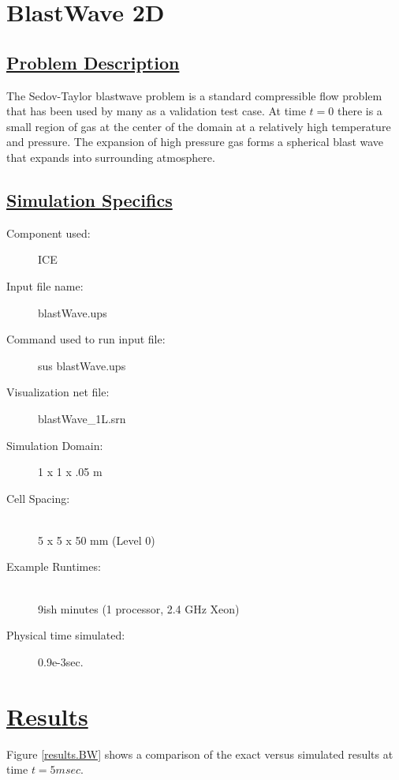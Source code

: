 
\section*{\center BlastWave 2D}
\subsection*{\underline{Problem Description}}
The Sedov-Taylor blastwave problem is a standard compressible flow problem
that has been used by many as a validation test case.  At time $t=0$ there
is a small region of gas at the center of the domain at a relatively high
temperature and pressure.  The expansion of high pressure gas forms a
spherical blast wave that expands into surrounding atmosphere.
\subsection*{\underline{Simulation Specifics}}
\begin{description} 
\item [Component used:] \hfill ICE
\item [Input file name:] \hfill blastWave.ups
\item [Command used to run input file:]\hfill sus blastWave.ups
\item [Visualization net file:]\hfill blastWave\_1L.srn\\


\item [Simulation Domain:]\hfill    1 x 1 x .05 m
\item [Cell Spacing:]\hfill \\ 
5 x 5 x 50 mm (Level 0)


\item [Example Runtimes:] \hfill \\
 9ish minutes   (1 processor, 2.4 GHz Xeon)

\item [Physical time simulated:] \hfill 0.9e-3sec.

\end{description}

\section*{\underline{Results}}
Figure \ref{results.BW} shows a comparison of the exact versus simulated
results at time $t = 5msec$.

